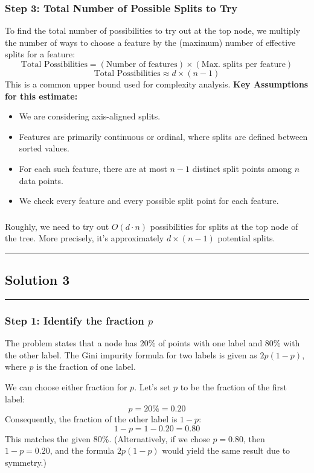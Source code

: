 \documentclass{article}
\begin{document}
\subsubsection*{Step 3: Total Number of Possible Splits to Try}
\parbox{\textwidth}{
To find the total number of possibilities to try out at the top node, we multiply the number of ways to choose a feature by the (maximum) number of effective splits for a feature:
$$ \text{Total Possibilities} = (\text{Number of features}) \times (\text{Max. splits per feature}) $$
$$ \text{Total Possibilities} \approx d \times (n-1) $$
This is a common upper bound used for complexity analysis.
\textbf{Key Assumptions for this estimate:}
\begin{itemize}
    \item We are considering axis-aligned splits.
    \item Features are primarily continuous or ordinal, where splits are defined between sorted values.
    \item For each such feature, there are at most $n-1$ distinct split points among $n$ data points.
    \item We check every feature and every possible split point for each feature.
\end{itemize}
}

\subsubsection*{}
\parbox{\textwidth}{
Roughly, we need to try out $O(d \cdot n)$ possibilities for splits at the top node of the tree. More precisely, it's approximately $d \times (n-1)$ potential splits.
}

\noindent\rule{\textwidth}{0.4pt}

\newpage

\subsection*{Solution 3}
\noindent\rule{\textwidth}{0.4pt}

\subsubsection*{Step 1: Identify the fraction $p$}
\parbox{\textwidth}{
The problem states that a node has 20\% of points with one label and 80\% with the other label. The Gini impurity formula for two labels is given as $2p(1-p)$, where $p$ is the fraction of one label.

We can choose either fraction for $p$. Let's set $p$ to be the fraction of the first label:
$$ p = 20\% = 0.20 $$
Consequently, the fraction of the other label is $1-p$:
$$ 1-p = 1 - 0.20 = 0.80 $$
This matches the given 80\%. (Alternatively, if we chose $p=0.80$, then $1-p=0.20$, and the formula $2p(1-p)$ would yield the same result due to symmetry.)
}
\end{document}
